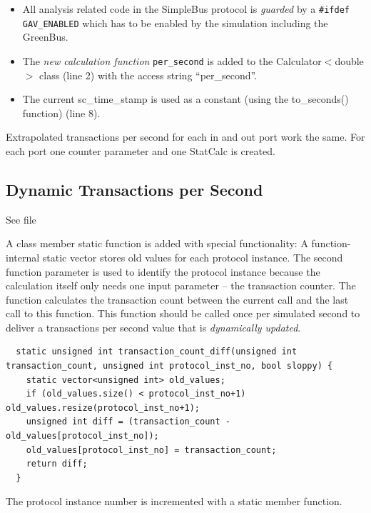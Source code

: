 \begin{itemize}

	\item  All analysis related code in the SimpleBus protocol is {\em guarded} by a \lstinline[language=TeX]|#ifdef GAV_ENABLED| which has to be enabled by the simulation including the GreenBus.

	\item  The {\em new calculation function} \lstinline|per_second| is added to the Calculator$<$double$>$ class (line 2) with the access string ``per\_second''.
	
	\item  The current sc\_time\_stamp is used as a constant (using the to\_seconds() function) (line 8).

\end{itemize}


Extrapolated transactions per second for each in and out port work the same. For each port one counter parameter and one StatCalc is created.

\subsection{Dynamic Transactions per Second}

See file 

A class member static function is added with special functionality: A function-internal static vector stores old values for each protocol instance. The second function parameter is used to identify the protocol instance because the calculation itself only needs one input parameter -- the transaction counter. The function calculates the transaction count between the current call and the last call to this function. This function should be called once per simulated second to deliver a transactions per second value that is {\em dynamically updated}.
\begin{lstlisting}
  static unsigned int transaction_count_diff(unsigned int transaction_count, unsigned int protocol_inst_no, bool sloppy) {
    static vector<unsigned int> old_values;
    if (old_values.size() < protocol_inst_no+1) old_values.resize(protocol_inst_no+1);
    unsigned int diff = (transaction_count - old_values[protocol_inst_no]);
    old_values[protocol_inst_no] = transaction_count;
    return diff;
  }
\end{lstlisting}

The protocol instance number is incremented with a static member function.

